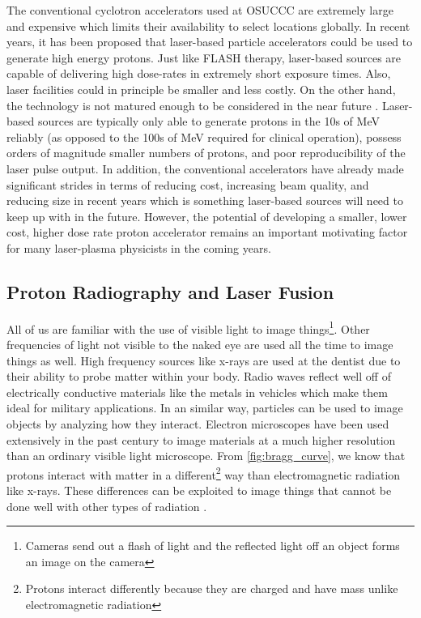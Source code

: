 The conventional cyclotron accelerators used at \gls{OSUCCC} are extremely large and expensive which limits their availability to select locations globally. In recent years, it has been proposed that laser-based particle accelerators could be used to generate high energy protons. Just like FLASH therapy, laser-based sources are capable of delivering high dose-rates in extremely short exposure times. Also, laser facilities could in principle be smaller and less costly. On the other hand, the technology is not matured enough to be considered in the near future \cite{Linz_2016_LaPB}. Laser-based sources are typically only able to generate protons in the 10s of MeV reliably (as opposed to the 100s of MeV required for clinical operation), possess orders of magnitude smaller numbers of protons, and poor reproducibility of the laser pulse output. In addition, the conventional accelerators have already made significant strides in terms of reducing cost, increasing beam quality, and reducing size in recent years \cite{Linz_2016_LaPB} which is something laser-based sources will need to keep up with in the future. However, the potential of developing a smaller, lower cost, higher dose rate proton accelerator remains an important motivating factor for many laser-plasma physicists in the coming years.

\subsection{Proton Radiography and Laser Fusion}

All of us are familiar with the use of visible light to image things\footnote{Cameras send out a flash of light and the reflected light off an object forms an image on the camera}. Other frequencies of light not visible to the naked eye are used all the time to image things as well. High frequency sources like x-rays are used at the dentist due to their ability to probe matter within your body. Radio waves reflect well off of electrically conductive materials like the metals in vehicles which make them ideal for military applications. In an similar way, particles can be used to image objects by analyzing how they interact. Electron microscopes have been used extensively in the past century to image materials at a much higher resolution than an ordinary visible light microscope. From \autoref{fig:bragg_curve}, we know that protons interact with matter in a different\footnote{Protons interact differently because they are charged and have mass unlike electromagnetic radiation} way than electromagnetic radiation like x-rays. These differences can be exploited to image things that cannot be done well with other types of radiation \cite{Schaeffer_2023_RevMod}.


